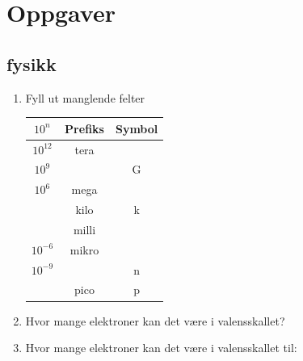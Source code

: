 \documentclass[12pt,a4paper]{article}
\providecommand{\tabularnewline}{\\}
\begin{document}
\section{Oppgaver}
\subsection{fysikk}
\begin{enumerate}
\item Fyll ut manglende felter\\
	\huge
\begin{tabular}{|c|c|c|}
\hline 
$10^{n}$ & Prefiks  & Symbol\tabularnewline
\hline 
\hline 
$10^{12}$ & tera & \tabularnewline
\hline 
$10^{9}$ &  & G\tabularnewline
\hline 
$10^{6}$ & mega & \tabularnewline
\hline 
 & kilo  & k\tabularnewline
\hline 
 & milli  & \tabularnewline
\hline 
$10^{-6}$ & mikro  & \textmu{}\tabularnewline
\hline 
$10^{-9}$ &  & n\tabularnewline
\hline 
 & pico  & p\tabularnewline
\hline 
\end{tabular}
\normalsize
\item Hvor mange elektroner kan det være i valensskallet?
\vskip 5pt 
\vskip 2.5pt 
\item Hvor mange elektroner kan det være i valensskallet til:


\end{enumerate}
\end{document}
